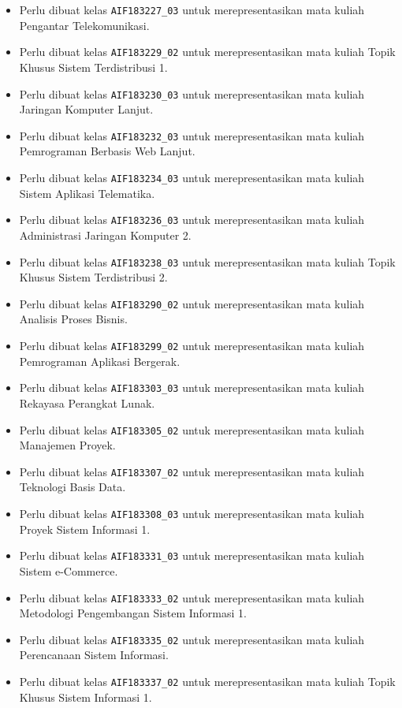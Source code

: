 \documentclass[a4paper,twoside]{article}
\begin{document}
\begin{enumerate}
\begin{enumerate}
\begin{enumerate}
\begin{itemize}
					\item Perlu dibuat kelas \texttt{AIF183227\_03} untuk merepresentasikan mata kuliah Pengantar Telekomunikasi.
					\item Perlu dibuat kelas \texttt{AIF183229\_02} untuk merepresentasikan mata kuliah Topik Khusus Sistem Terdistribusi 1.
					\item Perlu dibuat kelas \texttt{AIF183230\_03} untuk merepresentasikan mata kuliah Jaringan Komputer Lanjut.
					\item Perlu dibuat kelas \texttt{AIF183232\_03} untuk merepresentasikan mata kuliah Pemrograman Berbasis Web Lanjut.
					\item Perlu dibuat kelas \texttt{AIF183234\_03} untuk merepresentasikan mata kuliah Sistem Aplikasi Telematika.
					\item Perlu dibuat kelas \texttt{AIF183236\_03} untuk merepresentasikan mata kuliah Administrasi Jaringan Komputer 2.
					\item Perlu dibuat kelas \texttt{AIF183238\_03} untuk merepresentasikan mata kuliah Topik Khusus Sistem Terdistribusi 2.
					\item Perlu dibuat kelas \texttt{AIF183290\_02} untuk merepresentasikan mata kuliah Analisis Proses Bisnis.
					\item Perlu dibuat kelas \texttt{AIF183299\_02} untuk merepresentasikan mata kuliah Pemrograman Aplikasi Bergerak.
					\item Perlu dibuat kelas \texttt{AIF183303\_03} untuk merepresentasikan mata kuliah Rekayasa Perangkat Lunak.
					\item Perlu dibuat kelas \texttt{AIF183305\_02} untuk merepresentasikan mata kuliah Manajemen Proyek.
					\item Perlu dibuat kelas \texttt{AIF183307\_02} untuk merepresentasikan mata kuliah Teknologi Basis Data.
					\item Perlu dibuat kelas \texttt{AIF183308\_03} untuk merepresentasikan mata kuliah Proyek Sistem Informasi 1.
					\item Perlu dibuat kelas \texttt{AIF183331\_03} untuk merepresentasikan mata kuliah Sistem e-Commerce.
					\item Perlu dibuat kelas \texttt{AIF183333\_02} untuk merepresentasikan mata kuliah Metodologi Pengembangan Sistem Informasi 1.
					\item Perlu dibuat kelas \texttt{AIF183335\_02} untuk merepresentasikan mata kuliah Perencanaan Sistem Informasi.
					\item Perlu dibuat kelas \texttt{AIF183337\_02} untuk merepresentasikan mata kuliah Topik Khusus Sistem Informasi 1.

\end{itemize}
\end{enumerate}
\end{enumerate}
\end{enumerate}
\end{document}
